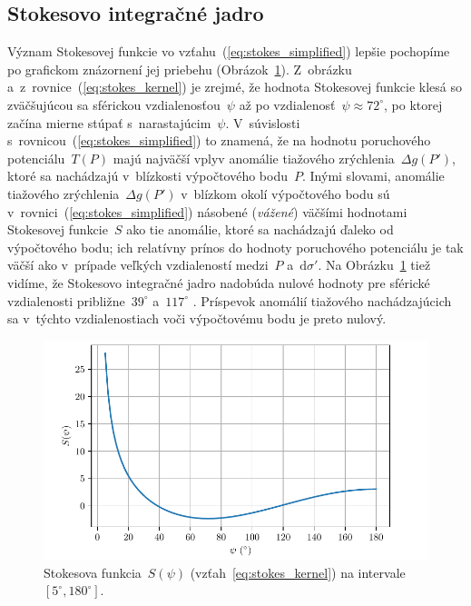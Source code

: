 \documentclass[a4paper, 12pt]{book}
\newcommand{\diff}{\mathrm d}
\begin{document}
\subsection{Stokesovo integračné jadro}
\label{sec:stokes_kernel}

Význam Stokesovej funkcie vo vzťahu~(\ref{eq:stokes_simplified}) lepšie 
pochopíme po grafickom znázornení jej priebehu 
(Obrázok~\ref{fig:stokes_kernel}).  Z~obrázku 
a~z~rovnice~(\ref{eq:stokes_kernel}) je zrejmé, že hodnota Stokesovej funkcie 
klesá so zväčšujúcou sa sférickou vzdialenosťou~$\psi$ až po vzdialenosť~$\psi 
\approx 72^\circ$, po ktorej začína mierne stúpať s~narastajúcim~$\psi$.  
V~súvislosti s~rovnicou~(\ref{eq:stokes_simplified}) to znamená, že na hodnotu 
poruchového potenciálu~$T(P)$ majú najväčší vplyv anomálie tiažového 
zrýchlenia~$\Delta g(P')$, ktoré sa nachádzajú v~blízkosti výpočtového 
bodu~$P$.  Inými slovami, anomálie tiažového zrýchlenia~$\Delta g(P')$ 
v~blízkom okolí výpočtového bodu sú v~rovnici~(\ref{eq:stokes_simplified}) 
násobené (\emph{vážené}) väčšími hodnotami Stokesovej funkcie~$S$ ako tie 
anomálie, ktoré sa nachádzajú ďaleko od výpočtového bodu; ich relatívny prínos 
do hodnoty poruchového potenciálu je tak väčší ako v~prípade veľkých 
vzdialeností medzi~$P$ a~$\diff\sigma'$.  Na Obrázku~\ref{fig:stokes_kernel} 
tiež vidíme, že Stokesovo integračné jadro nadobúda nulové hodnoty pre sférické 
vzdialenosti približne~$39^\circ$ a~$117^\circ$ \parencite{TorgeGeodesy}.  
Príspevok anomálií tiažového nachádzajúcich sa v~týchto vzdialenostiach voči 
výpočtovému bodu je preto nulový.

\begin{figure}[bt]
\centering
\includegraphics{./fig-stokes-kernel.pdf}
\caption{Stokesova funkcia~$S(\psi)$ (vzťah~\ref{eq:stokes_kernel}) na 
intervale~$[5^\circ, 180^\circ]$.}
\label{fig:stokes_kernel}
\end{figure}
\end{document}
